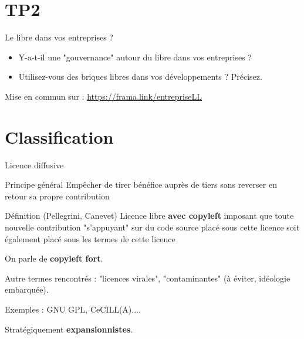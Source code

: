\documentclass{beamer}
\begin{document}
\section{TP2}

\begin{frame}{Le libre dans vos entreprises ?}

  \begin{itemize}
  \item Y-a-t-il une "gouvernance" autour du libre dans vos
    entreprises ?
  \item Utilisez-vous des briques libres dans vos développements ? Précisez.
  \end{itemize}
Mise en commun sur :
\url{https://frama.link/entrepriseLL}
  
\end{frame}




\section{Classification}


\begin{frame}{Licence diffusive}

  \begin{block}{Principe général}
    Empêcher de tirer bénéfice auprès de tiers sans reverser en retour sa propre contribution    
  \end{block}

  \begin{alertblock}{Définition (Pellegrini, Canevet)}
    Licence libre \textbf{avec copyleft} imposant que toute nouvelle contribution "s'appuyant" sur du code source placé sous cette licence soit également placé sous les termes de cette licence
   \end{alertblock}

On parle de \textbf{copyleft fort}.

Autre termes rencontrés : "licences virales", "contaminantes" (à éviter, idéologie embarquée).
  
Exemples : GNU GPL, CeCILL(A)....

Stratégiquement \textbf{expansionnistes}.
\end{frame}
\end{document}
